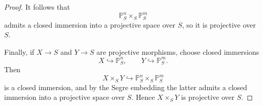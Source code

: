 \documentclass{article}
\begin{document}
\begin{proof}
It follows that
\[
\mathbb{P}^n_S \times_S \mathbb{P}^m_S
\]
admits a closed immersion into a projective space over $S$, so it is projective over $S$.

Finally, if $X \to S$ and $Y \to S$ are projective morphisms, choose closed immersions
\[
X \hookrightarrow \mathbb{P}^n_S, \qquad Y \hookrightarrow \mathbb{P}^m_S.
\]
Then
\[
X \times_S Y \hookrightarrow \mathbb{P}^n_S \times_S \mathbb{P}^m_S
\]
is a closed immersion, and by the Segre embedding the latter admits a closed immersion into a projective space over $S$. Hence $X \times_S Y$ is projective over $S$.
\end{proof}
\end{document}
